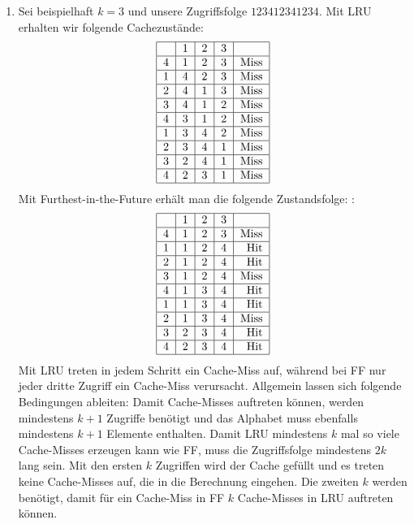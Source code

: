 \documentclass[a4paper,10pt]{article}
\begin{document}
\begin{enumerate}
\item Sei beispielhaft $k = 3$ und unsere Zugriffsfolge $123412341234$. Mit LRU erhalten wir folgende Cachezustände:\begin{align*} \begin{tabular}{| l | c | c | c | r |}
	\hline
	 & 1 & 2 & 3 & \\
	\hline
	4 & 1 & 2 & 3 & Miss\\
	\hline
	1 & 4 & 2 & 3 & Miss\\
	\hline
	2 & 4 & 1 & 3 & Miss\\
	\hline
	3 & 4 & 1 & 2 & Miss\\
	\hline
	4 & 3 & 1 & 2 & Miss\\
	\hline
	1 & 3 & 4 & 2 & Miss\\
	\hline
	2 & 3 & 4 & 1 & Miss\\
	\hline
	3 & 2 & 4 & 1 & Miss\\
	\hline
	4 & 2 & 3 & 1 & Miss\\
	\hline
\end{tabular} \end{align*} Mit Furthest-in-the-Future erhält man die folgende Zustandsfolge:
:\begin{align*} \begin{tabular}{| l | c | c | c | r |}
	\hline
	 & 1 & 2 & 3 & \\
	\hline
	4 & 1 & 2 & 3 & Miss\\
	\hline
	1 & 1 & 2 & 4 & Hit\\
	\hline
	2 & 1 & 2 & 4 & Hit\\
	\hline
	3 & 1 & 2 & 4 & Miss\\
	\hline
	4 & 1 & 3 & 4 & Hit\\
	\hline
	1 & 1 & 3 & 4 & Hit\\
	\hline
	2 & 1 & 3 & 4 & Miss\\
	\hline
	3 & 2 & 3 & 4 & Hit\\
	\hline
	4 & 2 & 3 & 4 & Hit\\
	\hline
\end{tabular} \end{align*}
Mit LRU treten in jedem Schritt ein Cache-Miss auf, während bei FF nur jeder dritte Zugriff ein Cache-Miss verursacht. Allgemein lassen sich folgende Bedingungen ableiten: Damit Cache-Misses auftreten können, werden mindestens $k+1$ Zugriffe benötigt und das Alphabet muss ebenfalls mindestens $k+1$ Elemente enthalten. Damit LRU mindestens $k$ mal so viele Cache-Misses erzeugen kann wie FF, muss die Zugriffsfolge mindestens $2k$ lang sein. Mit den ersten $k$ Zugriffen wird der Cache gefüllt und es treten keine Cache-Misses auf, die in die Berechnung eingehen. Die zweiten $k$ werden benötigt, damit für ein Cache-Miss in FF $k$ Cache-Misses in LRU auftreten können.\\

\end{enumerate}
\end{document}
